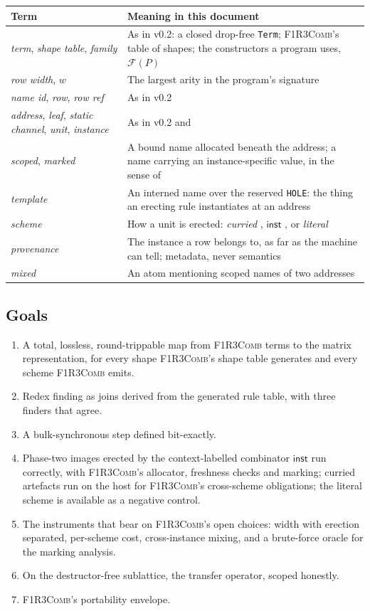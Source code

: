 \documentclass[11pt,a4paper]{article}
\newcommand{\code}[1]{\texttt{#1}}
\newcommand{\Comb}{\textsc{F1R3Comb}}
\theoremstyle{definition}
\theoremstyle{plain}
\newcommand{\inst}{\mathsf{inst}}
\newcommand{\Fam}{\mathcal{F}}
\begin{document}
\begin{center}
\begin{tabularx}{\linewidth}{@{}l>{\raggedright\arraybackslash}X@{}}
\toprule
Term & Meaning in this document\\
\midrule
\emph{term}, \emph{shape table}, \emph{family} & As in v0.2: a closed
drop-free \code{Term}; \Comb's table of shapes; the constructors a program
uses, $\Fam(P)$\\
\emph{row width}, $w$ & The largest arity in the program's signature\\
\emph{name id}, \emph{row}, \emph{row ref} & As in v0.2\\
\emph{address}, \emph{leaf}, \emph{static channel}, \emph{unit},
\emph{instance} & As in v0.2 and \cite[\S1.3]{combspec}\\
\emph{scoped}, \emph{marked} & A bound name allocated beneath the address; a
name carrying an instance-specific value, in the sense of
\cite[Rem.~6.20]{draft3}\\
\emph{template} & An interned name over the reserved \code{HOLE}: the thing
an erecting rule instantiates at an address\\
\emph{scheme} & How a unit is erected: \emph{curried}
\cite[\S6.7]{draft3}, \emph{$\inst$} \cite[\S6.7]{draft3}, or \emph{literal}
\cite[Def.~6.8]{draft3}\\
\emph{provenance} & The instance a row belongs to, as far as the machine can
tell; metadata, never semantics\\
\emph{mixed} & An atom mentioning scoped names of two addresses\\
\bottomrule
\end{tabularx}
\end{center}

\subsection{Goals}

\begin{enumerate}[leftmargin=1.6em]
\item A total, lossless, round-trippable map from \Comb{} terms to the matrix
representation, for every shape \Comb's shape table generates and every
scheme \Comb{} emits.
\item Redex finding as joins derived from the generated rule table, with three
finders that agree.
\item A bulk-synchronous step defined bit-exactly.
\item Phase-two images erected by the context-labelled combinator $\inst$
run correctly, with \Comb's allocator, freshness checks and marking; curried
artefacts run on the host for \Comb's cross-scheme obligations; the literal
scheme is available as a negative control.
\item The instruments that bear on \Comb's open choices: width with erection
separated, per-scheme cost, cross-instance mixing, and a brute-force oracle
for the marking analysis.
\item On the destructor-free sublattice, the transfer operator, scoped
honestly.
\item \Comb's portability envelope.
\end{enumerate}
\end{document}
